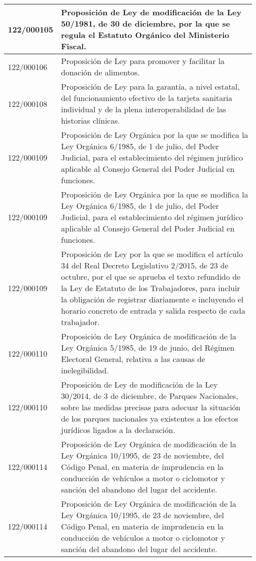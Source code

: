 {\begin{table}[H]
\begin{center}
\begin{tabularx}{\linewidth}{| l | X |}
\hline
122/000105 & Proposición de Ley de modificación de la Ley 50/1981, de 30 de diciembre, por la que se regula el Estatuto Orgánico del Ministerio Fiscal. \\
\hline
122/000106 & Proposición de Ley para promover y facilitar la donación de alimentos. \\
\hline
122/000108 & Proposición de Ley para la garantía, a nivel estatal, del funcionamiento efectivo de la tarjeta sanitaria individual y de la plena interoperabilidad de las historias clínicas. \\
\hline
122/000109 & Proposición de Ley Orgánica por la que se modifica la Ley Orgánica 6/1985, de 1 de julio, del Poder Judicial, para el establecimiento del régimen jurídico aplicable al Consejo General del Poder Judicial en funciones. \\
\hline
122/000109 & Proposición de Ley Orgánica por la que se modifica la Ley Orgánica 6/1985, de 1 de julio, del Poder Judicial, para el establecimiento del régimen jurídico aplicable al Consejo General del Poder Judicial en funciones. \\
\hline
122/000109 & Proposición de Ley por la que se modifica el artículo 34 del Real Decreto Legislativo 2/2015, de 23 de octubre, por el que se aprueba el texto refundido de la Ley de Estatuto de los Trabajadores, para incluir la obligación de registrar diariamente e incluyendo el horario concreto de entrada y salida respecto de cada trabajador. \\
\hline
122/000110 & Proposición de Ley Orgánica de modificación de la Ley Orgánica 5/1985, de 19 de junio, del Régimen Electoral General, relativa a las causas de inelegibilidad. \\
\hline
122/000110 & Proposición de Ley de modificación de la Ley 30/2014, de 3 de diciembre, de Parques Nacionales, sobre las medidas precisas para adecuar la situación de los parques nacionales ya existentes a los efectos jurídicos ligados a la declaración. \\
\hline
122/000114 & Proposición de Ley Orgánica de modificación de la Ley Orgánica 10/1995, de 23 de noviembre, del Código Penal, en materia de imprudencia en la conducción de vehículos a motor o ciclomotor y sanción del abandono del lugar del accidente. \\
\hline
122/000114 & Proposición de Ley Orgánica de modificación de la Ley Orgánica 10/1995, de 23 de noviembre, del Código Penal, en materia de imprudencia en la conducción de vehículos a motor o ciclomotor y sanción del abandono del lugar del accidente. \\

\end{tabularx}
\end{center}
\end{table}}
